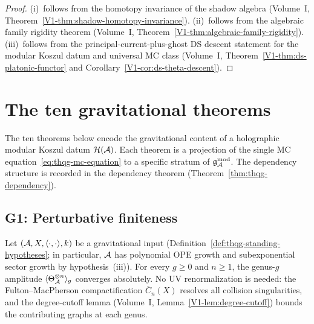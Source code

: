 \begin{proof}
(i)~follows from the homotopy invariance of the shadow algebra
(Volume~I, Theorem~\ref{V1-thm:shadow-homotopy-invariance}).
(ii)~follows from the algebraic family rigidity theorem
(Volume~I, Theorem~\ref{V1-thm:algebraic-family-rigidity}).
(iii)~follows from the principal-current-plus-ghost DS descent
statement for the modular Koszul datum and universal MC class
(Volume~I, Theorem~\ref{V1-thm:ds-platonic-functor} and
Corollary~\ref{V1-cor:ds-theta-descent}).
\end{proof}


%
%

\section{The ten gravitational theorems}

The ten theorems below encode the gravitational content of a holographic
modular Koszul datum $\mathcal{H}(\mathcal{A})$. Each theorem is a projection
of the single MC equation~\eqref{eq:thqg-mc-equation} to a specific
stratum of $\mathfrak{g}_{\mathcal{A}}^{\mathrm{mod}}$. The dependency structure is recorded in the
dependency theorem (Theorem~\ref{thm:thqg-dependency}).

\subsection{G1: Perturbative finiteness}

\begin{theorem}
Let $(\mathcal{A}, X, \langle\cdot,\cdot\rangle, k)$ be a gravitational input
(Definition~\ref{def:thqg-standing-hypotheses}; in particular,
$\mathcal{A}$ has polynomial OPE growth and subexponential sector growth
by hypothesis~\textup{(iii)}).
For every $g \ge 0$ and $n \ge 1$, the genus-$g$ amplitude
$\langle \Theta_{\mathcal{A}}^{\otimes n} \rangle_g$ converges absolutely.
No UV renormalization is needed: the Fulton--MacPherson compactification
$\overline{C}_n(X)$ resolves all collision singularities, and
the degree-cutoff lemma (Volume~I, Lemma~\ref{V1-lem:degree-cutoff}) bounds the
contributing graphs at each genus.
\end{theorem}

